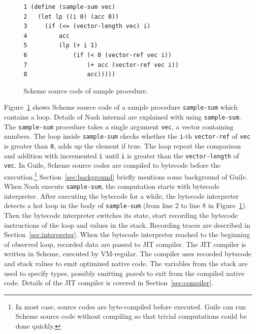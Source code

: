 \documentclass[preprint, 10pt]{sigplanconf}
\begin{document}
\begin{figure}
  \begin{center}
    \small
\begin{verbatim}
1 (define (sample-sum vec)
2   (let lp ((i 0) (acc 0))
3     (if (<= (vector-length vec) i)
4         acc
5         (lp (+ i 1)
6             (if (< 0 (vector-ref vec i))
7                 (+ acc (vector-ref vec i))
8                 acc)))))
\end{verbatim}
\end{center}
\caption{Scheme source code of sample procedure.}
\label{fig:scmloop}
\end{figure}

Figure~\hyperref[fig:scmloop]{\ref{fig:scmloop}} shows Scheme source code of a
sample procedure \texttt{sample-sum} which contains a loop. Details of Nash
internal are explained with using \texttt{sample-sum}. The \texttt{sample-sum}
procedure takes a single argument \texttt{vec}, a vector containing numbers. The
loop inside \texttt{sample-sum} checks whether the \texttt{i}-th
\texttt{vector-ref} of \texttt{vec} is greater than \texttt{0}, adds up the
element if true. The loop repeat the comparison and addition with incremented
\texttt{i} until \texttt{i} is greater than the \texttt{vector-length} of
\texttt{vec}. In Guile, Scheme source codes are compiled to bytecode before the
execution.\footnote{In most case, source codes are byte-compiled before
  executed. Guile can run Scheme source code without compiling so that trivial
  computations could be done quickly.}
Section~\hyperref[sec:background]{\ref{sec:background}} briefly mentions some
background of Guile. When Nash execute \texttt{sample-sum}, the computation
starts with bytecode interpreter. After executing the bytecode for a while, the
bytecode interpreter detects a hot loop in the body of \texttt{sample-sum} (from
line 2 to line 8 in Figure~\hyperref[fig:scmloop]{\ref{fig:scmloop}}). Then the
bytecode interpreter switches its state, start recording the bytecode
instructions of the loop and values in the stack. Recording traces are described
in Section~\hyperref[sec:interpreter]{\ref{sec:interpreter}}. When the bytecode
interpreter reached to the beginning of observed loop, recorded data are passed
to JIT compiler. The JIT compiler is written in Scheme, executed by
VM-regular. The compiler uses recorded bytecode and stack values to emit
optimized native code. The variables from the stack are used to specify types,
possibly emitting \textit{guards} to exit from the compiled native code. Details
of the JIT compiler is covered in
Section~\hyperref[sec:compiler]{\ref{sec:compiler}}.
\end{document}
